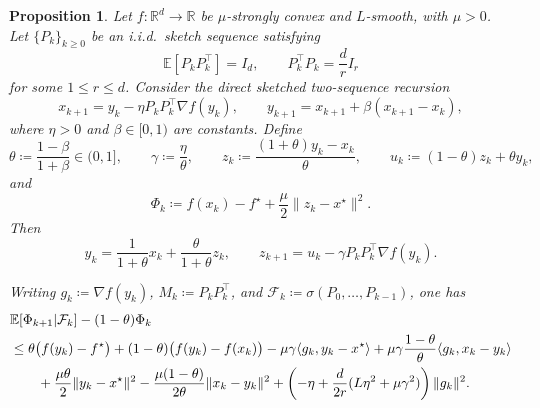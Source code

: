 \documentclass[10pt]{article}
\newtheorem{proposition}[proposition]{Proposition}
\begin{document}
\begin{proposition}
\label{prop:strong-two-seq-obstruction-collapse}
Let \(f:\mathbb{R}^d\to\mathbb{R}\) be \(\mu\)-strongly convex and \(L\)-smooth, with \(\mu>0\).
Let \(\{P_k\}_{k\ge 0}\) be an i.i.d.\ sketch sequence satisfying
\[
\mathbb{E}[P_kP_k^\top]=I_d,
\qquad
P_k^\top P_k=\frac{d}{r}I_r
\]
for some \(1\le r\le d\).
Consider the direct sketched two-sequence recursion
\begin{equation}
x_{k+1}=y_k-\eta P_kP_k^\top \nabla f(y_k),
\qquad
y_{k+1}=x_{k+1}+\beta(x_{k+1}-x_k),
\label{eq:strong-direct-two-seq-collapse}
\end{equation}
where \(\eta>0\) and \(\beta\in[0,1)\) are constants. Define
\[
\theta\coloneqq \frac{1-\beta}{1+\beta}\in(0,1],
\qquad
\gamma\coloneqq \frac{\eta}{\theta},
\qquad
z_k\coloneqq \frac{(1+\theta)y_k-x_k}{\theta},
\qquad
u_k\coloneqq (1-\theta)z_k+\theta y_k,
\]
and
\[
\Phi_k\coloneqq f(x_k)-f^\star+\frac{\mu}{2}\|z_k-x^\star\|^2.
\]
Then
\begin{equation}
y_k=\frac{1}{1+\theta}x_k+\frac{\theta}{1+\theta}z_k,
\qquad
z_{k+1}=u_k-\gamma P_kP_k^\top \nabla f(y_k).
\label{eq:strong-hidden-two-seq-collapse}
\end{equation}

Writing \(g_k\coloneqq \nabla f(y_k)\), \(M_k\coloneqq P_kP_k^\top\), and
\(\mathcal F_k\coloneqq \sigma(P_0,\dots,P_{k-1})\), one has
\begin{align}
&\mathbb{E}\!\left[\Phi_{k+1}\middle|\mathcal F_k\right]-(1-\theta)\Phi_k
\notag\\
&\le
\theta\bigl(f(y_k)-f^\star\bigr)
+(1-\theta)\bigl(f(y_k)-f(x_k)\bigr)
-\mu\gamma\langle g_k,y_k-x^\star\rangle
+\mu\gamma\frac{1-\theta}{\theta}\langle g_k,x_k-y_k\rangle
\notag\\
&\qquad
+\frac{\mu\theta}{2}\|y_k-x^\star\|^2
-\frac{\mu(1-\theta)}{2\theta}\|x_k-y_k\|^2
+\left(
-\eta+\frac{d}{2r}(L\eta^2+\mu\gamma^2)
\right)\|g_k\|^2.
\label{eq:strong-precollapse-general}
\end{align}


\end{proposition}
\end{document}
